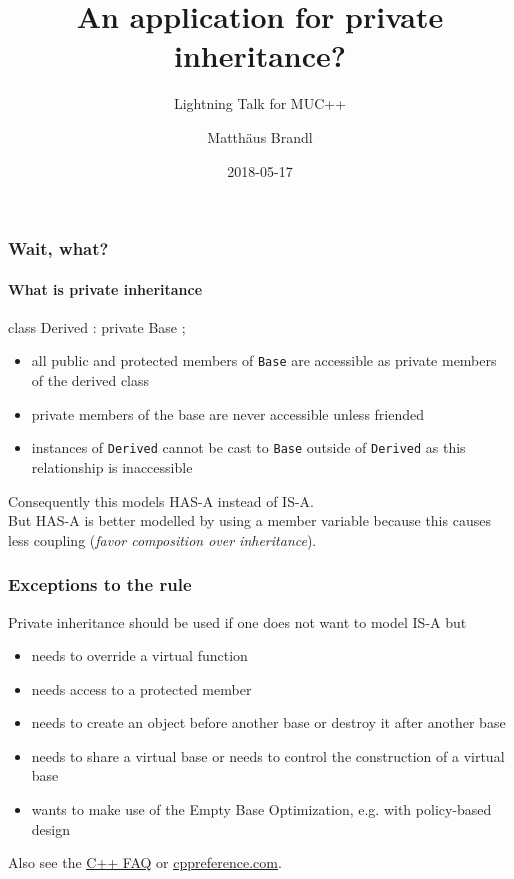 \documentclass{beamer}
\title{An application for private inheritance?}
\subtitle{Lightning Talk for MUC++}
\author{Matth\"aus Brandl}
\date{2018-05-17}
\def\code#1{\texttt{#1}}
\def\link#1#2{\href{#1}{\usebeamercolor[fg]{structure} \underline{#2}}}
\begin{document}

\frame{\titlepage}


\begin{frame}[fragile]
\frametitle{Wait, what?}
\framesubtitle{What is private inheritance}

\begin{C++}
class Derived : private Base
{};
\end{C++}

\begin{itemize}
\item all public and protected members of \code{Base} are accessible as private members of the derived class
\item private members of the base are never accessible unless friended
\item instances of \code{Derived} cannot be cast to \code{Base} outside of \code{Derived} as this relationship is inaccessible
\end{itemize}

\pause
Consequently this models HAS-A instead of IS-A.\\
But HAS-A is better modelled by using a member variable because this causes less coupling (\textit{favor composition over inheritance}).
\end{frame}


\begin{frame}[fragile]
\frametitle{Exceptions to the rule}
Private inheritance should be used if one does not want to model IS-A but
\begin{itemize}
\item needs to override a virtual function
\pause
\item needs access to a protected member
\pause
\item needs to create an object before another base or destroy it after another base
\pause
\item needs to share a virtual base or needs to control the construction of a virtual base
\pause
\item wants to make use of the Empty Base Optimization, e.g. with policy-based design
\end{itemize}
\pause
Also see the \link{https://isocpp.org/wiki/faq/private-inheritance}{C++ FAQ} or \link{https://en.cppreference.com/w/cpp/language/derived_class\#Private_inheritance}{cppreference.com}.
\end{frame}
\end{document}
